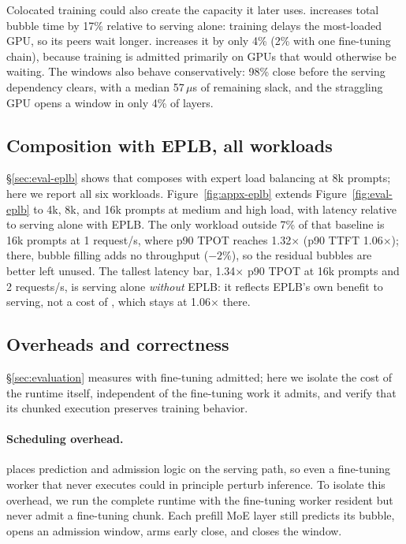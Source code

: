 Colocated training could also create the capacity it later uses.
\cfgUnthr increases total bubble time by 17\% relative to serving
alone: training delays the most-loaded GPU, so its peers wait longer.
\sys{} increases it by only 4\% (2\% with one fine-tuning chain), because training
is admitted primarily on GPUs that would otherwise be waiting. The
windows also behave conservatively: 98\% close before the serving
dependency clears, with a median 57\,$\mu$s of remaining slack, and
the straggling GPU opens a window in only 4\% of layers.

\subsection{Composition with EPLB, all workloads}
\label{sec:appx-eplb}

\S\ref{sec:eval-eplb} shows that \sys{} composes with expert load
balancing at 8k prompts; here we report all six workloads.
Figure~\ref{fig:appx-eplb} extends Figure~\ref{fig:eval-eplb} to 4k, 8k,
and 16k prompts at medium and high load, with latency relative to
serving alone with \ac{EPLB}. The only workload outside 7\% of that
baseline is 16k prompts at 1 request/s, where p90 \ac{TPOT} reaches
1.32$\times$ (p90 \ac{TTFT} 1.06$\times$); there, bubble filling adds
no throughput ($-2$\%), so the residual bubbles are better left unused.
The tallest latency bar, 1.34$\times$ p90 \ac{TPOT} at 16k prompts and
2 requests/s, is serving alone \emph{without} \ac{EPLB}: it reflects
\ac{EPLB}'s own benefit to serving, not a cost of \sys{}, which stays
at 1.06$\times$ there.

\subsection{Overheads and correctness}
\label{sec:eval-overheads}

\S\ref{sec:evaluation} measures \sys{} with fine-tuning admitted; here we
isolate the cost of the runtime itself, independent of the fine-tuning
work it admits, and verify that its chunked execution preserves
training behavior.

\paragraph{Scheduling overhead.}
\sys{} places prediction and admission logic on the serving path, so
even a fine-tuning worker that never executes could in principle perturb
inference. To isolate this overhead, we run the complete runtime with
the fine-tuning worker resident but never admit a fine-tuning chunk. Each prefill
\ac{MoE} layer still predicts its bubble, opens an admission window,
arms early close, and closes the window.


